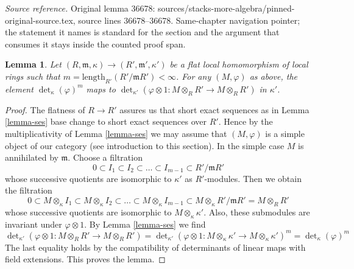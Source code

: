 \documentclass[10pt,a4paper]{amsart}
\theoremstyle{plain}
\newtheorem{lemma}[subsection]{Lemma}
\theoremstyle{definition}
\theoremstyle{remark}
\numberwithin{equation}{subsection}
\begin{document}
\noindent\textit{Source reference.} Original lemma 36678: sources/stacks-more-algebra/pinned-original-source.tex, source lines 36678--36678. Same-chapter navigation pointer; the statement it names is standard for the section and the argument that consumes it stays inside the counted proof span.\par\medskip
\begin{lemma}
\label{lemma-flat-base-change-det}
Let $(R, \mathfrak m, \kappa) \to (R', \mathfrak m', \kappa')$
be a flat local homomorphism of local rings such that
$m = \text{length}_{R'}(R'/\mathfrak mR') < \infty$.
For any $(M, \varphi)$ as above, the element
$\det_\kappa(\varphi)^m$ maps to
$\det_{\kappa'}(\varphi \otimes 1 : M \otimes_R R' \to M \otimes_R R')$
in $\kappa'$.
\end{lemma}

\begin{proof}
The flatness of $R \to R'$ assures us that short exact sequences
as in Lemma \ref{lemma-ses} base change to short exact sequences
over $R'$. Hence by the multiplicativity of Lemma \ref{lemma-ses}
we may assume that $(M, \varphi)$ is a simple object of our category
(see introduction to this section). In the simple case $M$ is annihilated
by $\mathfrak m$. Choose a filtration
$$
0 \subset I_1 \subset I_2 \subset \ldots \subset I_{m - 1} \subset
R'/\mathfrak mR'
$$
whose successive quotients are isomorphic to $\kappa'$ as $R'$-modules.
Then we obtain the filtration
$$
0 \subset
M \otimes_\kappa I_1 \subset
M \otimes_\kappa I_2 \subset
\ldots \subset
M \otimes_\kappa I_{m - 1} \subset
M \otimes_\kappa R'/\mathfrak mR' = M \otimes_R R'
$$
whose successive quotients are isomorphic to $M \otimes_\kappa \kappa'$.
Also, these submodules are invariant under $\varphi \otimes 1$.
By Lemma \ref{lemma-ses} we find
$$
\det\nolimits_{\kappa'}(\varphi \otimes 1 : M \otimes_R R' \to M \otimes_R R')
=
\det\nolimits_{\kappa'}(\varphi \otimes 1 :
M \otimes_\kappa \kappa' \to M \otimes_\kappa \kappa')^m =
\det\nolimits_\kappa(\varphi)^m
$$
The last equality holds by the compatibility of determinants
of linear maps with field extensions. This proves the lemma.
\end{proof}
\end{document}
